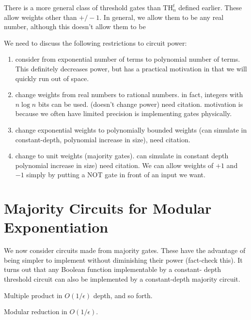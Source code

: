 There is a more general class of threshold gates than $\text{TH}_n^t$
defined earlier. These allow weights other than $+/-1$. In general, we
allow them to be any real number, although this doesn't allow them to
be 

We need to discuss the following restrictions to circuit power:

\begin{enumerate}

\item
consider from exponential number of terms to polynomial number
of terms. This definitely decreases power, but has a practical
motivation in that we will quickly run out of space.

\item
change weights from real numbers to rational numbers. in fact,
integers with $n \log n$ bits can be used. (doesn't change power) need citation. motivation is because we often have limited precision is
implementing gates physically.

\item
change exponential weights to polynomially bounded weights (can simulate in constant-depth, polynomial increase in size), need
citation.

\item
change to unit weights (majority gates). can simulate in
constant depth polynomial increase in size) need citation.
We can allow weights of $+1$ and $-1$ simply by putting a
NOT gate in front of an input we want.

\end{enumerate}

\section{Majority Circuits for Modular Exponentiation}

We now consider circuits made from majority gates. These have the
advantage of being simpler to implement without diminishing their power
(fact-check this).
It turns out that any Boolean function implementable by a constant-
depth threshold circuit can also be implemented by a constant-depth
majority circuit.

\begin{theorem}
Multiple product in $O(1/\epsilon)$ depth, and so forth.
\end{theorem}

\begin{theorem}
Modular reduction in $O(1/\epsilon)$.
\end{theorem}

